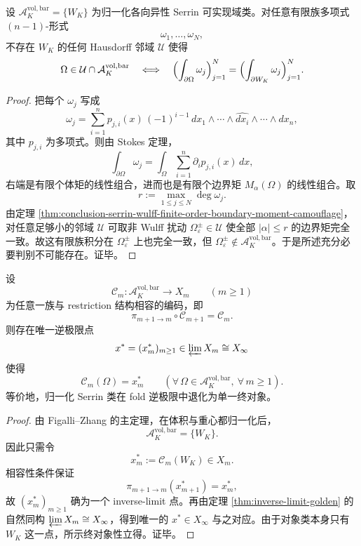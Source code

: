 \begin{corollary}\label{cor:conclusion-serrin-wulff-no-finite-polynomial-flux-discriminator}
设 \(\mathcal A_K^{\mathrm{vol,bar}}=\{W_K\}\) 为归一化各向异性 Serrin 可实现域类。对任意有限族多项式 \((n-1)\)-形式
\[
\omega_1,\dots,\omega_N,
\]
不存在 \(W_K\) 的任何 Hausdorff 邻域 \(\mathcal U\) 使得
\[
\Omega\in \mathcal U\cap \mathcal A_K^{\mathrm{vol,bar}}
\quad\Longleftrightarrow\quad
\Bigl(\int_{\partial\Omega}\omega_j\Bigr)_{j=1}^N
=
\Bigl(\int_{\partial W_K}\omega_j\Bigr)_{j=1}^N.
\]
\end{corollary}
\begin{proof}
把每个 \(\omega_j\) 写成
\[
\omega_j=\sum_{i=1}^n p_{j,i}(x)\,
(-1)^{i-1}\,dx_1\wedge\cdots\wedge\widehat{dx_i}\wedge\cdots\wedge dx_n,
\]
其中 \(p_{j,i}\) 为多项式。则由 Stokes 定理，
\[
\int_{\partial\Omega}\omega_j
=
\int_\Omega \sum_{i=1}^n \partial_i p_{j,i}(x)\,dx,
\]
右端是有限个体矩的线性组合，进而也是有限个边界矩 \(M_\alpha(\Omega)\) 的线性组合。取
\[
r:=\max_{1\le j\le N}\deg\omega_j.
\]
由定理 \ref{thm:conclusion-serrin-wulff-finite-order-boundary-moment-camouflage}，对任意足够小的邻域 \(\mathcal U\) 可取非 Wulff 扰动 \(\Omega_\varepsilon^\pm\in\mathcal U\) 使全部 \(|\alpha|\le r\) 的边界矩完全一致。故这有限族积分在 \(\Omega_\varepsilon^\pm\) 上也完全一致，但 \(\Omega_\varepsilon^\pm\notin\mathcal A_K^{\mathrm{vol,bar}}\)。于是所述充分必要判别不可能存在。证毕。
\end{proof}

\begin{theorem}\label{thm:conclusion-serrin-wulff-terminal-object-inverse-limit}
设
\[
\mathscr C_m:\mathcal A_K^{\mathrm{vol,bar}}\to X_m
\qquad(m\ge 1)
\]
为任意一族与 restriction 结构相容的编码，即
\[
\pi_{m+1\to m}\circ \mathscr C_{m+1}=\mathscr C_m.
\]
则存在唯一逆极限点
\[
x^\ast=(x_m^\ast)_{m\ge 1}\in \varprojlim X_m\cong X_\infty
\]
使得
\[
\mathscr C_m(\Omega)=x_m^\ast
\qquad
(\forall\,\Omega\in\mathcal A_K^{\mathrm{vol,bar}},\ \forall\,m\ge 1).
\]
等价地，归一化 Serrin 类在 fold 逆极限中退化为单一终对象。
\end{theorem}
\begin{proof}
由 Figalli--Zhang 的主定理，在体积与重心都归一化后，
\[
\mathcal A_K^{\mathrm{vol,bar}}=\{W_K\}.
\]
因此只需令
\[
x_m^\ast:=\mathscr C_m(W_K)\in X_m.
\]
相容性条件保证
\[
\pi_{m+1\to m}(x_{m+1}^\ast)=x_m^\ast,
\]
故 \((x_m^\ast)_{m\ge 1}\) 确为一个 inverse-limit 点。再由定理 \ref{thm:inverse-limit-golden} 的自然同构 \(\varprojlim X_m\cong X_\infty\)，得到唯一的 \(x^\ast\in X_\infty\) 与之对应。由于对象类本身只有 \(W_K\) 这一点，所示终对象性立得。证毕。
\end{proof}


